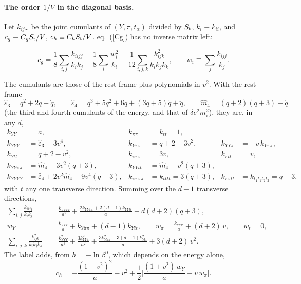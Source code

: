 \documentclass[11pt,aps,preprint,nofootinbib,superscriptaddress,tightenlines]{revtex4-2}
\def\st{\begin{equation}}
\def\stp{\end{equation}}
\def\Eq#1{eq.~(\ref{#1})}
\let\oldparagraph\paragraph
\renewcommand{\paragraph}{\par\bigskip\oldparagraph}
\begin{document}
\paragraph{The order $1/V$ in the diagonal basis.}  Let $k_{ij\cdots}$ be the joint cumulants of $(Y,\pi,t_\alpha)$ divided by $S_{\rm t}$,
$k_i\equiv k_{ii}$, and $c_g\equiv C_gS_{\rm t}/V$, $c_h\equiv C_hS_{\rm t}/V$.  \Eq{Cg} has no inverse matrix left:
\begin{keyeq}
\st
c_g=\frac18\sum_{i,j}\frac{k_{iijj}}{k_ik_j}-\frac18\sum_i\frac{w_i^2}{k_i}-\frac1{12}\sum_{i,j,k}\frac{k_{ijk}^2}{k_ik_jk_k},\qquad
w_i\equiv\sum_j\frac{k_{ijj}}{k_j} .
\label{cgdiag}
\stp
\end{keyeq}
The cumulants are those of the rest frame plus polynomials in $v^2$.  With the rest-frame
\st
\hat\varepsilon_3=q^2+2q+\dot q,\qquad \hat\varepsilon_4=q^3+5q^2+6q+(3q+5)\dot q+\ddot q,\qquad \hat m_4=(q+2)(q+3)+\dot q
\stp
(the third and fourth cumulants of the energy, and that of $\delta e^2m_i^2$), they are, in any $d$,
\begin{align}
k_{YY}&=a, & k_{\pi\pi}&=k_{tt}=1, \nonumber\\
k_{YYY}&=\hat\varepsilon_3-3v^4, & k_{Y\pi\pi}&=q+2-3v^2, & k_{YY\pi}&=-v\,k_{Y\pi\pi}, \nonumber\\
k_{Ytt}&=q+2-v^2, & k_{\pi\pi\pi}&=3v, & k_{\pi tt}&=v, \nonumber\\
k_{YY\pi\pi}&=\hat m_4-3v^2(q+3), & k_{YYtt}&=\hat m_4-v^2(q+3), \nonumber\\
k_{YYYY}&=\hat\varepsilon_4+2v^2\hat m_4-9v^4(q+3), & k_{\pi\pi\pi\pi}&=k_{tttt}=3(q+3), & k_{\pi\pi tt}&=k_{t_1t_1t_2t_2}=q+3 ,
\end{align}
with $t$ any one transverse direction.  Summing over the $d-1$ transverse directions,
\begin{align}
\sum_{i,j}\frac{k_{iijj}}{k_ik_j}&=\frac{k_{YYYY}}{a^2}+\frac{2k_{YY\pi\pi}+2(d-1)k_{YYtt}}a+d(d+2)(q+3), \nonumber\\
w_Y&=\frac{k_{YYY}}a+k_{Y\pi\pi}+(d-1)k_{Ytt},\qquad w_\pi=\frac{k_{YY\pi}}a+(d+2)\,v,\qquad w_t=0, \nonumber\\
\sum_{i,j,k}\frac{k_{ijk}^2}{k_ik_jk_k}&=\frac{k_{YYY}^2}{a^3}+\frac{3k_{YY\pi}^2}{a^2}+\frac{3k_{Y\pi\pi}^2+3(d-1)k_{Ytt}^2}a+3(d+2)\,v^2 .
\end{align}
The label adds, from $h=-\ln\beta^0$, which depends on the energy alone,
\st
c_h=-\frac{(1+v^2)^2}a-v^2+\frac12\Big[\frac{(1+v^2)\,w_Y}a-v\,w_\pi\Big] .
\label{chdiag}
\stp
\end{document}
